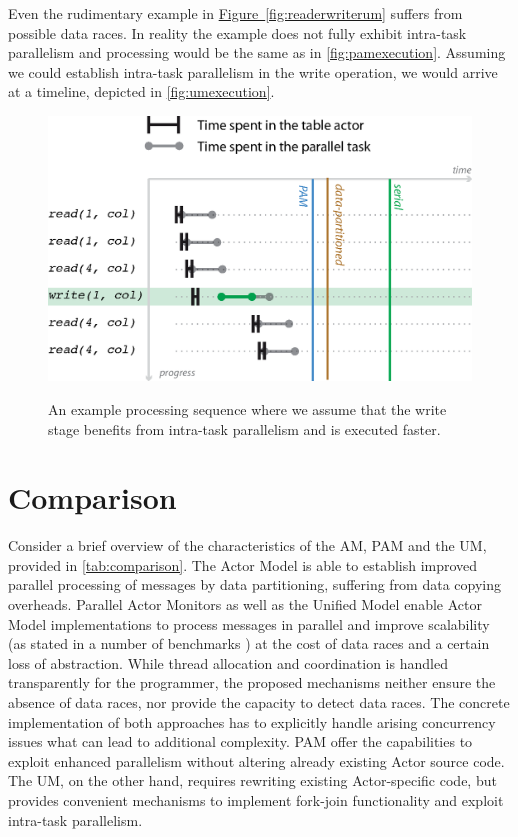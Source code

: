 \documentclass[11pt, journal]{IEEEtran}
\newcommand{\figref}[1]{\hyperref[{fig:#1}]{Figure~\ref*{fig:#1}}}
\begin{document}
Even the rudimentary example in \figref{readerwriterum} suffers from possible data races. In reality the example does not fully exhibit intra-task parallelism and processing would be the same as in \autoref{fig:pamexecution}. Assuming we could establish intra-task parallelism in the write operation, we would arrive at a timeline, depicted in \autoref{fig:umexecution}.

\begin{figure}[!htbp]
\centering
\includegraphics[width=\columnwidth]{figures/processing-04.eps}
\begin{caption}
	{An example processing sequence where we assume that the write stage benefits from intra-task parallelism and is executed faster.} \label{fig:umexecution}
\end{caption}
\end{figure}

\section{Comparison}\label{sec:comparison}
Consider a brief overview of the characteristics of the AM, PAM and the UM, provided in \autoref{tab:comparison}. The Actor Model is able to establish improved parallel processing of messages by data partitioning, suffering from data copying overheads. Parallel Actor Monitors as well as the Unified Model enable Actor Model implementations to process messages in parallel and improve scalability (as stated in a number of benchmarks \cite{Scholliers2010a, Imam:2012:ITP:2384616.2384671}) at the cost of data races and a certain loss of abstraction. While thread allocation and coordination is handled transparently for the programmer, the proposed mechanisms neither ensure the absence of data races, nor provide the capacity to detect data races. The concrete implementation of both approaches has to explicitly handle arising concurrency issues what can lead to additional complexity. PAM offer the capabilities to exploit enhanced parallelism without altering already existing Actor source code. The UM, on the other hand, requires rewriting existing Actor-specific code, but provides convenient mechanisms to implement fork-join functionality and exploit intra-task parallelism.
\end{document}
